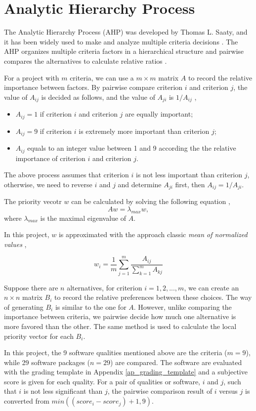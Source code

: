 \section{Analytic Hierarchy Process}
The Analytic Hierarchy Process (AHP) was developed by Thomas L. Saaty, and it has been widely used to make and analyze multiple criteria decisions \cite{VaidyaEtAl2006}. The AHP organizes multiple criteria factors in a hierarchical structure and pairwise compares the alternatives to calculate relative ratios \cite{Saaty1990}.

For a project with $ m $ criteria, we can use a  $m\times m$ matrix $A$ to record the relative importance between factors. By pairwise compare criterion $i$ and criterion $j$, the value of $A_{ij}$ is decided as follows, and the value of $A_{ji}$ is $1/A_{ij}$ \cite{Saaty1990},
\begin{itemize}
\item $A_{ij} = 1$ if criterion $i$ and criterion $j$ are equally important;
\item $A_{ij} = 9$ if criterion $i$ is extremely more important than criterion $j$;
\item $A_{ij}$ equals to an integer value between 1 and 9 according the the relative importance of criterion $i$ and criterion $j$.
\end{itemize}

The above process assumes that criterion $i$ is not less important than criterion $j$, otherwise, we need to reverse $i$ and $j$ and determine $A_{ji}$ first, then $A_{ij} = 1/A_{ji}$.

The priority vecotr $w$ can be calculated by solving the following equation \cite{Saaty1990}, \begin{equation}
Aw = \lambda_{max}w,
\end{equation}
where $\lambda_{max}$ is the maximal eigenvalue of $A$.

In this project, $w$ is approximated with the approach classic \textit{mean of normalized values}  \cite{AlessioEtAl2006},

\begin{equation}
w_i = \frac{1}{m}\sum_{j=1}^{m}\frac{A_{ij}}{\sum_{k=1}^{m}A_{kj}}
\end{equation}

Suppose there are $n$ alternatives, for criterion $i = 1, 2, ... , m$, we can create an $n\times n$ matrix $B_i$ to record the relative preferences between these choices. The way of generating $B_i$ is similar to the one for $A$. However, unlike comparing the importance between criteria, we pairwise decide how much one alternative is more favored than the other. The same method is used to calculate the local priority vector for each $B_i$.

In this project, the 9 software qualities mentioned above are the criteria ($m = 9$), while 29 software packages ($n = 29$) are compared. The software are evaluated with the grading template in Appendix \ref{ap_grading_template} and a subjective score is given for each quality. For a pair of qualities or software, $i$ and $j$, such that $i$ is not less significant than $j$, the pairwise comparison result of $i$ versus $j$ is converted from $min((score_i - score_j) + 1, 9)$.
